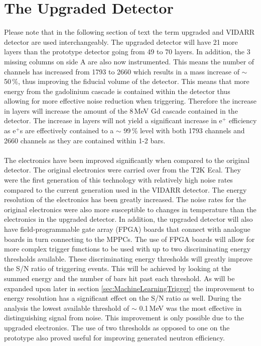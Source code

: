 \section{The Upgraded Detector}\label{sec:theUpgradedDetector}
Please note that in the following section of text the term upgraded and VIDARR detector are used interchangeably. The upgraded detector will have 21 more layers than the prototype detector going from 49 to 70 layers. In addition, the 3 missing columns on side A are also now instrumented. This means the number of channels has increased from 1793 to 2660 which results in a mass increase of $\sim$ 50\,\%, thus improving the fiducial volume of the detector. This means that more energy from the gadolinium cascade is contained within the detector thus allowing for more effective noise reduction when triggering. Therefore the increase in layers will increase the amount of the 8\,MeV Gd cascade contained in the detector. The increase in layers will not yield a significant increase in e$^+$ efficiency as e$^+$s are effectively contained to a $\sim$ 99\,\% level with both 1793 channels and 2660 channels as they are contained within 1-2 bars.
\\\\The electronics have been improved significantly when compared to the original detector. The original electronics were carried over from the T2K Ecal. They were the first generation of this technology with relatively high noise rates compared to the current generation used in the VIDARR detector. The energy resolution of the electronics has been greatly increased. The noise rates for the original electronics were also more susceptible to changes in temperature than the electronics in the upgraded detector. In addition, the upgraded detector will also have field-programmable gate array (FPGA) boards that connect with analogue boards in turn connecting to the MPPCs. The use of FPGA boards will allow for more complex trigger functions to be used with up to two discriminating energy thresholds available. These discriminating energy thresholds will greatly improve the S/N ratio of triggering events. This will be achieved by looking at the summed energy and the number of bars hit past each threshold. As will be expanded upon later in section \ref{sec:MachineLearningTrigger} the improvement to energy resolution has a significant effect on the S/N ratio as well. During the analysis the lowest available threshold of $\sim$ 0.1\,MeV was the most effective in distinguishing signal from noise. This improvement is only possible due to the upgraded electronics. The use of two thresholds as opposed to one on the prototype also proved useful for improving generated neutron efficiency. 
